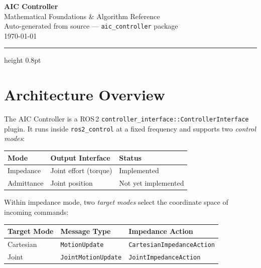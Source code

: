 \documentclass[11pt,a4paper]{article}
\begin{document}
\begin{center}
  {\LARGE\bfseries\sffamily AIC Controller}\\[4pt]
  {\Large\sffamily Mathematical Foundations \& Algorithm Reference}\\[12pt]
  {\normalsize Auto-generated from source --- \texttt{aic\_controller} package}\\[2pt]
  {\small\today}
\end{center}

\vspace{6pt}
\hrule height 0.8pt
\vspace{10pt}

\tableofcontents
\newpage

\section{Architecture Overview}
\label{sec:arch}

The AIC Controller is a ROS\,2 \texttt{controller\_interface::ControllerInterface}
plugin.  It runs inside \texttt{ros2\_control} at a fixed frequency and supports
two \emph{control modes}:

\begin{center}
\begin{tabular}{lll}
\toprule
\textbf{Mode} & \textbf{Output Interface} & \textbf{Status} \\
\midrule
Impedance  & Joint effort (torque) & Implemented \\
Admittance & Joint position        & Not yet implemented \\
\bottomrule
\end{tabular}
\end{center}

Within impedance mode, two \emph{target modes} select the coordinate space of
incoming commands:

\begin{center}
\begin{tabular}{lll}
\toprule
\textbf{Target Mode} & \textbf{Message Type} & \textbf{Impedance Action} \\
\midrule
Cartesian & \texttt{MotionUpdate}      & \texttt{CartesianImpedanceAction} \\
Joint     & \texttt{JointMotionUpdate} & \texttt{JointImpedanceAction} \\
\bottomrule
\end{tabular}
\end{center}
\end{document}
